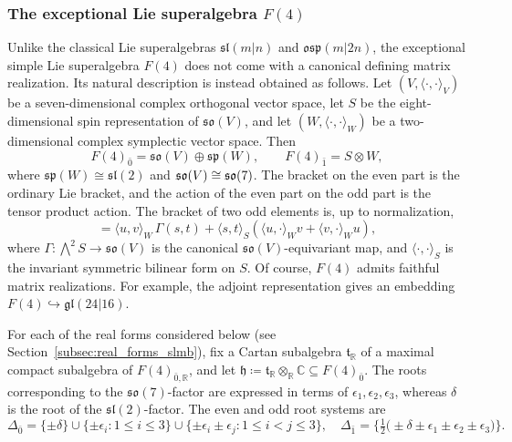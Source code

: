 \subsubsection{The exceptional Lie superalgebra \texorpdfstring{$F(4)$}{F(4)}}\label{subsec::F4}
Unlike the classical Lie superalgebras
$\mathfrak{sl}(m\vert n)$ and $\mathfrak{osp}(m\vert 2n)$, the exceptional simple Lie superalgebra $F(4)$ does not come with a canonical defining matrix
realization. Its natural description is instead obtained as follows. Let $(V,\langle\cdot,\cdot\rangle_{V})$ be a
seven-dimensional complex orthogonal vector space, let $S$ be the
eight-dimensional spin representation of $\mathfrak{so}(V)$, and let
$(W,\langle\cdot,\cdot\rangle_{W})$ be a two-dimensional complex symplectic vector space. Then
\begin{equation}
F(4)_{\bar0}
=
\mathfrak{so}(V)\oplus\mathfrak{sp}(W),
\qquad
F(4)_{\bar1}
=
S\otimes W,
\end{equation}
where $\mathfrak{sp}(W)\cong\mathfrak{sl}(2)$ and ${\mathfrak{so}}(V)\cong {\mathfrak{so}}(7)$. The bracket on the even
part is the ordinary Lie bracket, and the action of the even part on the
odd part is the tensor product action. The bracket of two odd elements is,
up to normalization,
\begin{equation}
[s\otimes u,t\otimes v]
=
\langle u,v\rangle_{W}\,\Gamma(s,t)
+
\langle s,t\rangle_{S}(\langle u,\cdot\rangle_{W}v+\langle v,\cdot\rangle_{W}u),
\end{equation}
where
$\Gamma:\bigwedge^{2}S\to\mathfrak{so}(V)$ is the canonical
$\mathfrak{so}(V)$-equivariant map, and $\langle \cdot,\cdot\rangle_{S}$ is the invariant symmetric bilinear form on $S$. Of course, $F(4)$ admits faithful matrix realizations. For example, the
adjoint representation gives an embedding
$
F(4)\hookrightarrow\mathfrak{gl}(24\vert16).
$ 




For each of the real forms considered below (see Section~\ref{subsec:real_forms_slmb}), fix a Cartan subalgebra
$\mathfrak t_{\mathbb R}$ of a maximal compact subalgebra of
$F(4)_{\bar0,\mathbb R}$, and let
$
\mathfrak h\coloneqq\mathfrak t_{\mathbb R}\otimes_{\mathbb R}\mathbb C
\subseteq F(4)_{\bar{0}}.
$ The roots corresponding to the $\mathfrak{so}(7)$-factor are expressed
in terms of $\epsilon_1,\epsilon_2,\epsilon_3$, whereas $\delta$ is the
root of the $\mathfrak{sl}(2)$-factor. The even and odd root systems are
\begin{equation}
\Delta_{\bar0}
=
\{\pm\delta\}
\cup
\{\pm\epsilon_i:1\leq i\leq3\}
\cup
\{\pm\epsilon_i\pm\epsilon_j:1\leq i<j\leq3\},
\quad 
\Delta_{\bar1}
=
\{
\tfrac12
\bigl(
\pm\delta\pm\epsilon_1\pm\epsilon_2\pm\epsilon_3
\bigr)
\}.
\end{equation}

